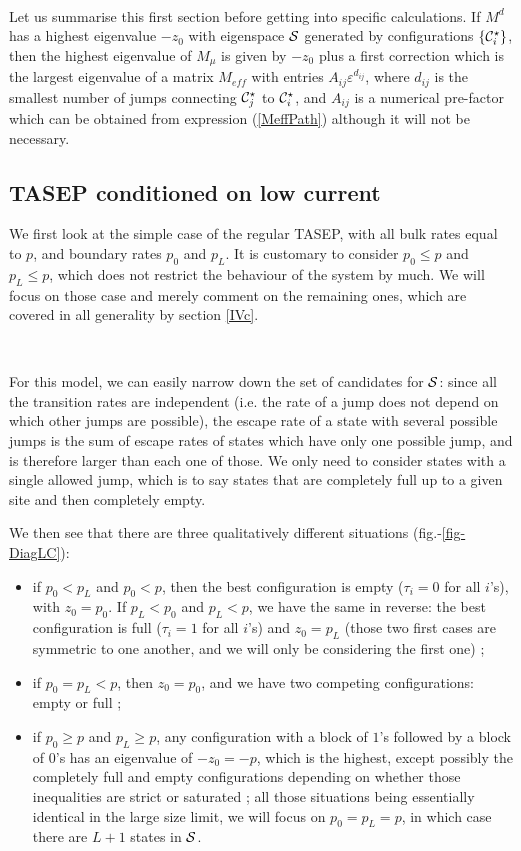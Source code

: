 \documentclass[aps,pre,onecolumn,showpacs,showkeys,a4paper]{revtex4-1}
\begin{document}
~

Let us summarise this first section before getting into specific calculations. If $M^d$ has a highest eigenvalue $-z_0$ with eigenspace ${\cal S}$ generated by configurations $\{{\cal C}_i^\star\}$, then the highest eigenvalue of $M_\mu$ is given by $-z_0$ plus a first correction which is the largest eigenvalue of a matrix $M_{eff}$ with entries $A_{ij}\varepsilon^{d_{ij}}$, where $d_{ij}$ is the smallest number of jumps connecting ${\cal C}_j^\star$ to ${\cal C}_i^\star$, and $A_{ij}$ is a numerical pre-factor which can be obtained from expression (\ref{MeffPath}) although it will not be necessary.


\subsection{TASEP conditioned on low current}
\label{IVb}

We first look at the simple case of the regular TASEP, with all bulk rates equal to $p$, and boundary rates $p_0$ and $p_L$. It is customary to consider $p_0\leq p$ and $p_L\leq p$, which does not restrict the behaviour of the system by much. We will focus on those case and merely comment on the remaining ones, which are covered in all generality by section \ref{IVc}.

~

For this model, we can easily narrow down the set of candidates for ${\cal S}$: since all the transition rates are independent (i.e. the rate of a jump does not depend on which other jumps are possible), the escape rate of a state with several possible jumps is the sum of escape rates of states which have only one possible jump, and is therefore larger than each one of those. We only need to consider states with a single allowed jump, which is to say states that are completely full up to a given site and then completely empty.

We then see that there are three qualitatively different situations (fig.-\ref{fig-DiagLC}):
\begin{itemize}
\item if $p_0<p_L$ and $p_0<p$, then the best configuration is empty ($\tau_i=0$ for all $i$'s), with $z_0=p_0$. If $p_L<p_0$ and $p_L<p$, we have the same in reverse: the best configuration is full ($\tau_i=1$ for all $i$'s) and $z_0=p_L$ (those two first cases are symmetric to one another, and we will only be considering the first one) ;
\item if $p_0=p_L<p$, then $z_0=p_0$, and we have two competing configurations: empty or full ;
\item if $p_0\geq p$ and $p_L\geq p$, any configuration with a block of $1$'s followed by a block of $0$'s has an eigenvalue of $-z_0=-p$, which is the highest, except possibly the completely full and empty configurations depending on whether those inequalities are strict or saturated ; all those situations being essentially identical in the large size limit, we will focus on $p_0=p_L=p$, in which case there are $L+1$ states in ${\cal S}$.
\end{itemize}
\end{document}
